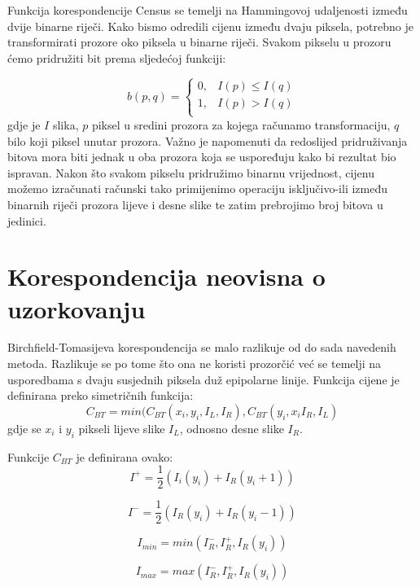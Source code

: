 \documentclass[utf8, zavrsni, numeric]{fer}
\begin{document}
Funkcija korespondencije Census se temelji na Hammingovoj udaljenosti između dvije binarne riječi. Kako bismo odredili cijenu između dvaju piksela, potrebno je transformirati
prozore oko piksela u binarne riječi. Svakom pikselu u prozoru ćemo pridružiti bit prema sljedećoj funkciji:

\[   
b(p, q) = 
     \begin{cases}
       0, & I(p) \leq I(q) \\
       1, & I(p) > I(q) \\
     \end{cases}
\]
gdje je $I$ slika, $p$ piksel u sredini prozora za kojega računamo transformaciju, $q$ bilo koji piksel unutar prozora. Važno je napomenuti da redoslijed pridruživanja bitova mora biti jednak u oba
prozora koja se uspoređuju kako bi rezultat bio ispravan. Nakon što svakom pikselu pridružimo binarnu vrijednost, cijenu možemo izračunati
računski tako primijenimo operaciju isključivo-ili između binarnih riječi prozora lijeve i desne slike te zatim prebrojimo broj bitova u jedinici.

\section{Korespondencija neovisna o uzorkovanju}

Birchfield-Tomasijeva korespondencija se malo razlikuje od do sada navedenih metoda. Razlikuje se po tome što ona ne koristi prozorčić već se temelji na usporedbama s dvaju susjednih piksela duž epipolarne linije.
Funkcija cijene je definirana preko simetričnih funkcija:
$$ C_{BT} = min(C_{BT}(x_i, y_i, I_L, I_R), C_{BT}(y_i, x_i I_R, I_L) $$
gdje se $x_i$ i $y_i$ pikseli lijeve slike $I_L$, odnosno desne slike $I_R$.

Funkcije $C_{BT}$ je definirana ovako:
\begin{equation}
I^+ = \frac{1}{2}(I_i(y_i) + I_R(y_i + 1))
\end{equation}

\begin{equation}
I^- = \frac{1}{2}(I_R(y_i) + I_R(y_i - 1))
\end{equation}

\begin{equation}
I_{min} = min(I^-_R, I^+_R, I_R(y_i))
\end{equation}

\begin{equation}
I_{max} = max(I^-_R, I^+_R, I_R(y_i))
\end{equation}
\end{document}
